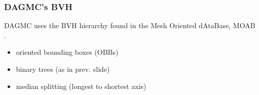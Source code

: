 \documentclass[12pt]{beamer}
\begin{document}
\begin{frame}
\frametitle{DAGMC's BVH}

DAGMC uses the BVH hierarchy found in the Mesh Oriented dAtaBase, MOAB \cite{moab}.
\begin{center}
\end{center}

\begin{itemize}
\item oriented bounding boxes (OBBs)
\item binary trees (as in prev. slide)
\item median splitting (longest to shortest axis)
\end{itemize}

\end{frame}
\end{document}
